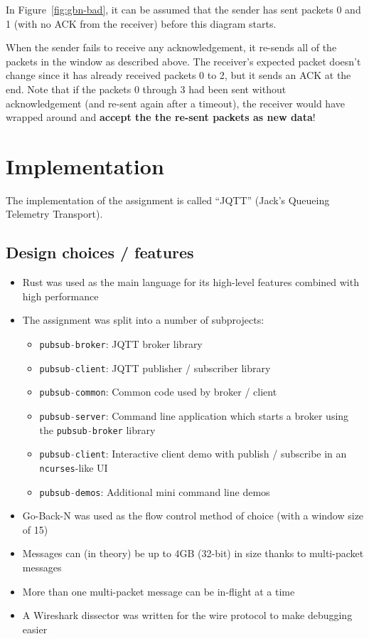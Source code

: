 \documentclass[a4paper]{article}
\numberwithin{figure}{section}
\numberwithin{table}{section}
\newcommand{\mi}{\mintinline}
\begin{document}
\newpage
In Figure~\ref{fig:gbn-bad}, it can be assumed that the sender has sent packets 0 and 1 (with no ACK from the receiver) before this diagram starts.

When the sender fails to receive any acknowledgement, it re-sends all of the packets in the window as described above. The receiver's expected packet doesn't change since it has already received packets 0 to 2, but it sends an ACK at the end. Note that if the packets 0 through 3 had been sent without acknowledgement (and re-sent again after a timeout), the receiver would have wrapped around and \textbf{accept the the re-sent packets as new data}!

\section{Implementation}
The implementation of the assignment is called ``JQTT'' (Jack's Queueing Telemetry Transport).
\subsection{Design choices / features}
\begin{itemize}
	\item Rust was used as the main language for its high-level features combined with high performance \cite{rust-lang}
	\item The assignment was split into a number of subprojects:
		\begin{itemize}
			\item \mi{c}{pubsub-broker}: JQTT broker library
			\item \mi{c}{pubsub-client}: JQTT publisher / subscriber library
			\item \mi{c}{pubsub-common}: Common code used by broker / client
			\item \mi{c}{pubsub-server}: Command line application which starts a broker using the \mi{c}{pubsub-broker} library
			\item \mi{c}{pubsub-client}: Interactive client demo with publish / subscribe in an \mi{c}{ncurses}-like UI
			\item \mi{c}{pubsub-demos}: Additional mini command line demos
		\end{itemize}
	\item Go-Back-N was used as the flow control method of choice (with a window size of 15)
	\item Messages can (in theory) be up to 4GB (32-bit) in size thanks to multi-packet messages
	\item More than one multi-packet message can be in-flight at a time
	\item A Wireshark dissector was written for the wire protocol to make debugging easier
\end{itemize}
\end{document}
